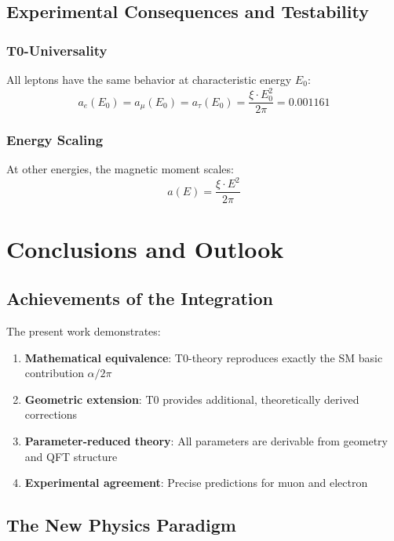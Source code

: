 \documentclass[12pt,a4paper]{article}
\numberwithin{equation}{section}
\newcommand{\xipar}{\xi}
\begin{document}
	\subsection{Experimental Consequences and Testability}
	
	\subsubsection{T0-Universality}
	
	All leptons have the same behavior at characteristic energy $E_0$:
	\begin{equation}
		a_e(E_0) = a_\mu(E_0) = a_\tau(E_0) = \frac{\xipar \cdot E_0^2}{2\pi} = 0.001161
	\end{equation}
	
	\subsubsection{Energy Scaling}
	
	At other energies, the magnetic moment scales:
	\begin{equation}
		a(E) = \frac{\xipar \cdot E^2}{2\pi}
	\end{equation}
	
	\section{Conclusions and Outlook}
	
	\subsection{Achievements of the Integration}
	
	The present work demonstrates:
	
	\begin{enumerate}
		\item \textbf{Mathematical equivalence}: T0-theory reproduces exactly the SM basic contribution $\alpha/2\pi$
		\item \textbf{Geometric extension}: T0 provides additional, theoretically derived corrections
		\item \textbf{Parameter-reduced theory}: All parameters are derivable from geometry and QFT structure
		\item \textbf{Experimental agreement}: Precise predictions for muon and electron
	\end{enumerate}
	
	\subsection{The New Physics Paradigm}
	
\end{document}
